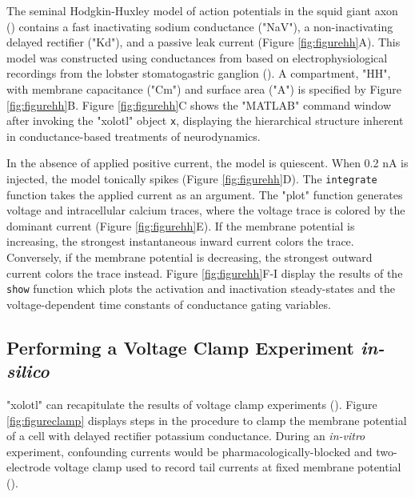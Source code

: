 \documentclass{frontiersSCNS} %
\begin{document}
The seminal Hodgkin-Huxley model of action potentials in the squid giant axon (\cite{hodgkinComponentsMembraneConductance1952, hodgkinMeasurementCurrentvoltageRelations1952}) contains a fast inactivating sodium conductance ("NaV"), a non-inactivating delayed rectifier ("Kd"), and a passive leak current (Figure \ref{fig:figurehh}A). This model was constructed using conductances from \cite{liuModelNeuronActivitydependent1998} based on electrophysiological recordings from the lobster stomatogastric ganglion (\cite{turrigianoSelectiveRegulationCurrent1995}). A compartment, "HH", with membrane capacitance ("Cm") and surface area ("A") is specified by Figure \ref{fig:figurehh}B. Figure \ref{fig:figurehh}C shows the "MATLAB" command window after invoking the "xolotl" object \texttt{x}, displaying the hierarchical structure inherent in conductance-based treatments of neurodynamics.

In the absence of applied positive current, the model is quiescent. When 0.2 nA is injected, the model tonically spikes (Figure \ref{fig:figurehh}D). The \texttt{integrate} function takes the applied current as an argument. The "plot" function generates voltage and intracellular calcium traces, where the voltage trace is colored by the dominant current (Figure \ref{fig:figurehh}E). If the membrane potential is increasing, the strongest instantaneous inward current colors the trace. Conversely, if the membrane potential is decreasing, the strongest outward current colors the trace instead. Figure \ref{fig:figurehh}F-I display the results of the \texttt{show} function which plots the activation and inactivation steady-states and the voltage-dependent time constants of conductance gating variables.

%
%
%
%
%
%

\subsection{Performing a Voltage Clamp Experiment \textit{in-silico}}

"xolotl" can recapitulate the results of voltage clamp experiments (\cite{turrigianoSelectiveRegulationCurrent1995, swensenMultiplePeptidesConverge2000, swensenModulatorsConvergentCellular2001, destexheDynamicClampPrinciplesApplications2009}). Figure \ref{fig:figureclamp} displays steps in the procedure to clamp the membrane potential of a cell with delayed rectifier potassium conductance. During an \textit{in-vitro} experiment, confounding currents would be pharmacologically-blocked and two-electrode voltage clamp used to record tail currents at fixed membrane potential (\cite{connorInwardDelayedOutward1971, connorVoltageClampStudies1971}).
\end{document}

